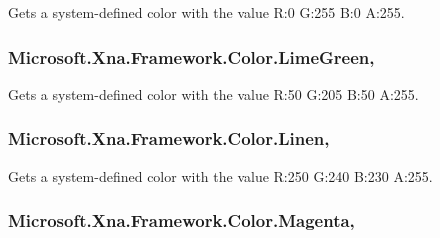 Gets a system-\/defined color with the value R\+:0 G\+:255 B\+:0 A\+:255.

\hypertarget{struct_microsoft_1_1_xna_1_1_framework_1_1_color_a678dcf6808989867c0b52242d4194df3}{}
\subsubsection[{Lime\+Green}]{ Microsoft.\+Xna.\+Framework.\+Color.\+Lime\+Green\hspace{0.3cm}{\ttfamily [static]}, {\ttfamily [get]}}\label{struct_microsoft_1_1_xna_1_1_framework_1_1_color_a678dcf6808989867c0b52242d4194df3}


Gets a system-\/defined color with the value R\+:50 G\+:205 B\+:50 A\+:255.

\hypertarget{struct_microsoft_1_1_xna_1_1_framework_1_1_color_a7e6151709b8d5a821466d189f319a7a6}{}
\subsubsection[{Linen}]{ Microsoft.\+Xna.\+Framework.\+Color.\+Linen\hspace{0.3cm}{\ttfamily [static]}, {\ttfamily [get]}}\label{struct_microsoft_1_1_xna_1_1_framework_1_1_color_a7e6151709b8d5a821466d189f319a7a6}


Gets a system-\/defined color with the value R\+:250 G\+:240 B\+:230 A\+:255.

\hypertarget{struct_microsoft_1_1_xna_1_1_framework_1_1_color_ad73e67f7969432c254155ea8ef40c843}{}
\subsubsection[{Magenta}]{ Microsoft.\+Xna.\+Framework.\+Color.\+Magenta\hspace{0.3cm}{\ttfamily [static]}, {\ttfamily [get]}}\label{struct_microsoft_1_1_xna_1_1_framework_1_1_color_ad73e67f7969432c254155ea8ef40c843}



